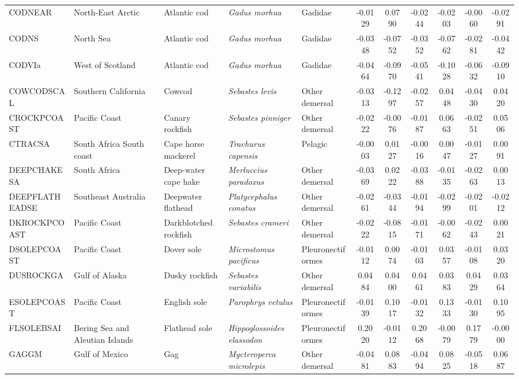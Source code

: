 \begin{longtable}{p{3cm}p{3cm}lllcccccc}
  CODNEAR & North-East Arctic & Atlantic cod & \textit{Gadus morhua} & Gadidae & -0.0129 & 0.0790 & -0.0244 & -0.0203 & -0.0060 & -0.0291 \\
  CODNS & North Sea & Atlantic cod & \textit{Gadus morhua} & Gadidae & -0.0348 & -0.0752 & -0.0352 & -0.0762 & -0.0281 & -0.0442 \\
  CODVIa & West of Scotland & Atlantic cod & \textit{Gadus morhua} & Gadidae & -0.0464 & -0.0970 & -0.0541 & -0.1028 & -0.0632 & -0.0910 \\
  COWCODSCAL & Southern California & Cowcod & \textit{Sebastes levis} & Other demersal & -0.0313 & -0.1297 & -0.0257 & 0.0448 & -0.0430 & 0.0420 \\
  CROCKPCOAST & Pacific Coast & Canary rockfish & \textit{Sebastes pinniger} & Other demersal & -0.0222 & -0.0076 & -0.0187 & 0.0663 & -0.0251 & 0.0506 \\
  CTRACSA & South Africa South coast & Cape horse mackerel & \textit{Trachurus capensis} & Pelagic & -0.0003 & 0.0127 & -0.0016 & 0.0047 & -0.0127 & 0.0091 \\
  DEEPCHAKESA & South Africa & Deep-water cape hake & \textit{Merluccius paradoxus} & Other demersal & -0.0369 & 0.0222 & -0.0388 & -0.0135 & -0.0263 & 0.0013 \\
  DEEPFLATHEADSE & Southeast Australia & Deepwater flathead & \textit{Platycephalus conatus} & Other demersal & -0.0261 & -0.0344 & -0.0194 & -0.0299 & -0.0201 & -0.0212 \\
  DKROCKPCOAST & Pacific Coast & Darkblotched rockfish & \textit{Sebastes crameri} & Other demersal & -0.0222 & -0.0815 & -0.0171 & -0.0062 & -0.0243 & 0.0021 \\
  DSOLEPCOAST & Pacific Coast & Dover sole & \textit{Microstomus pacificus} & Pleuronectiformes & -0.0112 & 0.0074 & -0.0103 & 0.0357 & -0.0108 & 0.0320 \\
  DUSROCKGA & Gulf of Alaska & Dusky rockfish & \textit{Sebastes variabilis} & Other demersal & 0.0484 & 0.0400 & 0.0461 & 0.0383 & 0.0429 & 0.0364 \\
  ESOLEPCOAST & Pacific Coast & English sole & \textit{Parophrys vetulus} & Pleuronectiformes & -0.0139 & 0.1017 & -0.0132 & 0.1333 & -0.0130 & 0.1095 \\
  FLSOLEBSAI & Bering Sea and Aleutian Islands & Flathead sole & \textit{Hippoglossoides elassodon} & Pleuronectiformes & 0.2020 & -0.0112 & 0.2068 & -0.0079 & 0.1779 & -0.0000 \\
  GAGGM & Gulf of Mexico & Gag & \textit{Mycteroperca microlepis} & Other demersal & -0.0481 & 0.0883 & -0.0494 & 0.0825 & -0.0518 & 0.0687 \\

\end{longtable}
